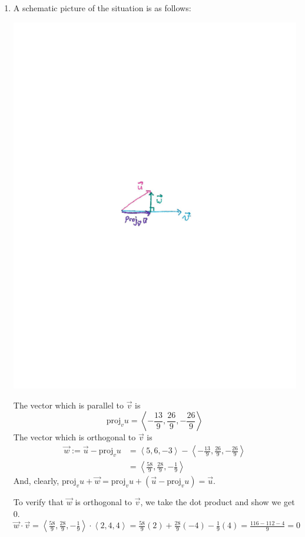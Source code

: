 \documentclass[noinstructornotes]{ximera}
\begin{document}
\begin{problem}
\begin{freeResponse}
\begin{enumerate}
	\item  A schematic picture of the situation is as follows:
		\begin{image}
		\includegraphics[trim= 170 350 170 350, scale=1]{Figure12-3-1.pdf}
		\end{image}
		
	The vector which is parallel to $\vec{v}$ is 
		\[
		\text{proj}_v u = \boxed{\left\langle - \frac{13}{9}, \frac{26}{9}, - \frac{26}{9} \right\rangle}
		\]
	The vector which is orthogonal to $\vec{v}$ is
		\begin{align*}
		\vec{w} := \vec{u} - \text{proj}_v u
		&= \left\langle 5,6,-3 \right\rangle - \left\langle - \frac{13}{9}, \frac{26}{9}, - \frac{26}{9} \right\rangle  \\
		&= \boxed{\left\langle \frac{58}{9}, \frac{28}{9}, - \frac{1}{9} \right\rangle}
		\end{align*}
	And, clearly, $\text{proj}_v u + \vec{w} = \text{proj}_v u + (\vec{u} - \text{proj}_v u) = \vec{u}$.  
	
	To verify that $\vec{w}$ is orthogonal to $\vec{v}$, we take the dot product and show we get 0. \\
	$\vec{w} \cdot \vec{v} = \left\langle \frac{58}{9}, \frac{28}{9}, - \frac{1}{9} \right\rangle \cdot \left\langle 2,4,4 \right\rangle  = \frac{58}{9} (2) + \frac{28}{9}  (-4) -  \frac{1}{9} (4) = \frac{116-112 -4}{9}=0$ 
	
	\end{enumerate}
	
	\end{freeResponse}

\end{problem}
\end{document}
